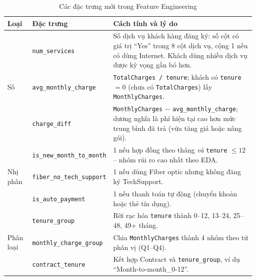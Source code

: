 \begin{table}[H]
\centering
\begin{tabular}{l l p{8.3cm}}
\toprule
\textbf{Loại} & \textbf{Đặc trưng} & \textbf{Cách tính và lý do} \\
\midrule
\multirow{3}{*}{Số} & \texttt{num\_services} & Số dịch vụ khách hàng đăng ký: số cột có giá trị ``Yes'' trong 8 cột dịch vụ, cộng 1 nếu có dùng Internet. Khách dùng nhiều dịch vụ được kỳ vọng gắn bó hơn. \\
 & \texttt{avg\_monthly\_charge} & \texttt{TotalCharges / tenure}; khách có \texttt{tenure} $=0$ (chưa có \texttt{TotalCharges}) lấy \texttt{MonthlyCharges}. \\
 & \texttt{charge\_diff} & \texttt{MonthlyCharges} $-$ \texttt{avg\_monthly\_charge}; dương nghĩa là phí hiện tại cao hơn mức trung bình đã trả (vừa tăng giá hoặc nâng gói). \\
\midrule
\multirow{3}{*}{Nhị phân} & \texttt{is\_new\_month\_to\_month} & 1 nếu hợp đồng theo tháng \textit{và} \texttt{tenure} $\le 12$ -- nhóm rủi ro cao nhất theo EDA. \\
 & \texttt{fiber\_no\_tech\_support} & 1 nếu dùng Fiber optic nhưng không đăng ký TechSupport. \\
 & \texttt{is\_auto\_payment} & 1 nếu thanh toán tự động (chuyển khoản hoặc thẻ tín dụng). \\
\midrule
\multirow{3}{*}{Phân loại} & \texttt{tenure\_group} & Rời rạc hóa \texttt{tenure} thành 0--12, 13--24, 25--48, 49+ tháng. \\
 & \texttt{monthly\_charge\_group} & Chia \texttt{MonthlyCharges} thành 4 nhóm theo tứ phân vị (Q1--Q4). \\
 & \texttt{contract\_tenure} & Kết hợp Contract và \texttt{tenure\_group}, ví dụ ``Month-to-month\_0-12''. \\
\bottomrule
\end{tabular}
\caption{Các đặc trưng mới trong Feature Engineering}
\end{table}

